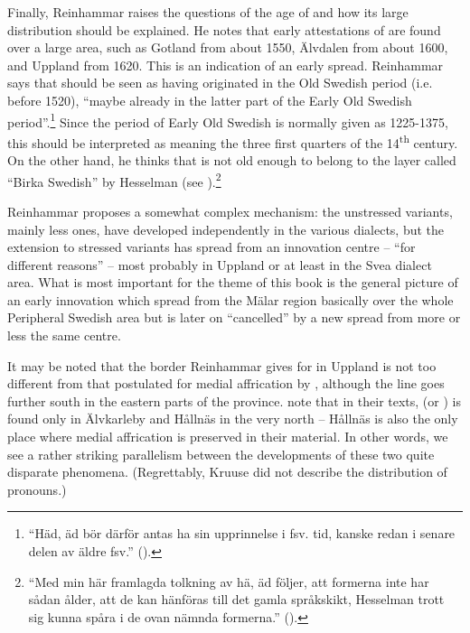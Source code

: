 Finally, Reinhammar raises the questions of the age of  and how its large distribution should be explained. He notes that early attestations of  are found over a large area, such as Gotland from about 1550, Älvdalen from about 1600, and Uppland from 1620. This is an indication of an early spread. Reinhammar says that  should be seen as having originated in the Old Swedish period (i.e. before 1520), “maybe already in the latter part of the Early Old Swedish period”.\footnote{ “Häd, äd bör därför antas ha sin upprinnelse i fsv. tid, kanske redan i senare delen av äldre fsv.” (\citet[189]{Reinhammar1975}).} Since the period of Early Old Swedish is normally given as 1225-1375, this should be interpreted as meaning the three first quarters of the 14\textsuperscript{th} century. On the other hand, he thinks that is not old enough to belong to the layer called “Birka Swedish” by Hesselman (see ).\footnote{ “Med min här framlagda tolkning av hä, äd följer, att formerna inte har sådan ålder, att de kan hänföras till det gamla språkskikt, Hesselman trott sig kunna spåra i de ovan nämnda formerna.” (\citet[190]{Reinhammar1975}).} 

Reinhammar proposes a somewhat complex mechanism: the unstressed variants, mainly less ones, have developed independently in the various dialects, but the extension to stressed variants has spread from an innovation centre – “for different reasons” –  most probably in Uppland or at least in the Svea dialect area. What is most important for the theme of this book is the general picture of an early innovation which spread from the Mälar region basically over the whole Peripheral Swedish area but is later on “cancelled” by a new spread from more or less the same centre. 

It may be noted that the border Reinhammar gives for  in Uppland is not too different from that postulated for medial affrication by \citet{Kruuse1908}, although the  line goes further south in the eastern parts of the province. \citet{KällskogEtAl1993} note that in their texts,  (or ) is found only in Älvkarleby and Hållnäs in the very north – Hållnäs is also the only place where medial affrication is preserved in their material. In other words, we see a rather striking parallelism between the developments of these two quite disparate phenomena. (Regrettably, Kruuse did not describe the distribution of pronouns.)

